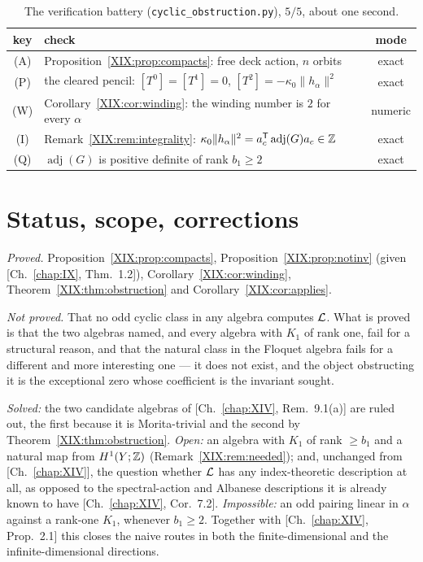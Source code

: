 \begin{table}[ht]
\centering\small
\begin{tabular}{clc}
\toprule
key & check & mode\\
\midrule
(A) & Proposition~\ref{XIX:prop:compacts}: free deck action, $n$ orbits & exact\\
(P) & the cleared pencil: $[T^0]=[T^1]=0$, $[T^2]=-\kappa_0\|h_\alpha\|^2$ & exact\\
(W) & Corollary~\ref{XIX:cor:winding}: the winding number is $2$ for every $\alpha$ & numeric\\
(I) & Remark~\ref{XIX:rem:integrality}: $\kappa_0\|h_\alpha\|^2=a_c^{\mathsf T}\operatorname{adj}(G)a_c\in\mathbb{Z}$ & exact\\
(Q) & $\operatorname{adj}(G)$ is positive definite of rank $b_1\ge2$ & exact\\
\bottomrule
\end{tabular}
\caption{The verification battery (\texttt{cyclic\_obstruction.py}), $5/5$, about one
second.}
\label{XIX:tab:battery}
\end{table}

\section{Status, scope, corrections}\label{XIX:sec:scope}

\emph{Proved.} Proposition~\ref{XIX:prop:compacts}, Proposition~\ref{XIX:prop:notinv} (given
[Ch.~\ref{chap:IX}, Thm.~1.2]), Corollary~\ref{XIX:cor:winding}, Theorem~\ref{XIX:thm:obstruction} and
Corollary~\ref{XIX:cor:applies}.

\emph{Not proved.} That no odd cyclic class in any algebra computes $\mathcal{L}$. What is proved
is that the two algebras named, and every algebra with $K_1$ of rank one, fail for a
structural reason, and that the natural class in the Floquet algebra fails for a different
and more interesting one --- it does not exist, and the object obstructing it is the
exceptional zero whose coefficient is the invariant sought.

\begin{remark}\label{XIX:rem:soi}
\emph{Solved:} the two candidate algebras of [Ch.~\ref{chap:XIV}, Rem.~9.1(a)] are ruled out, the first
because it is Morita-trivial and the second by Theorem~\ref{XIX:thm:obstruction}.
\emph{Open:} an algebra with $K_1$ of rank $\ge b_1$ and a natural map from $H^1(Y;\mathbb{Z})$
(Remark~\ref{XIX:rem:needed}); and, unchanged from [Ch.~\ref{chap:XIV}], the question whether $\mathcal{L}$ has any
index-theoretic description at all, as opposed to the spectral-action and Albanese
descriptions it is already known to have [Ch.~\ref{chap:XIV}, Cor.~7.2].
\emph{Impossible:} an odd pairing linear in $\alpha$ against a rank-one $K_1$, whenever
$b_1\ge2$. Together with [Ch.~\ref{chap:XIV}, Prop.~2.1] this closes the naive routes in both the
finite-dimensional and the infinite-dimensional directions.
\end{remark}

